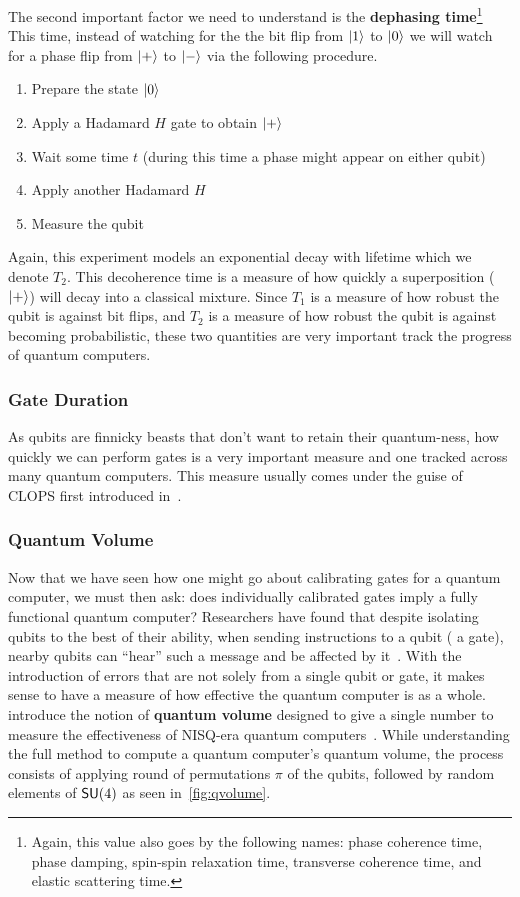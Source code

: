 The second important factor we need to understand is the \textbf{dephasing time}\footnote{Again, this value also goes by the following names: phase coherence time, phase damping, spin-spin relaxation time, transverse coherence time, and elastic scattering time.}
This time, instead of watching for the the bit flip from $\ket{1}$ to $\ket{0}$ we will watch for a phase flip from $\ket{+}$ to $\ket{-}$ via the following procedure.
\begin{enumerate}
    \item Prepare the state $\ket{0}$
    \item Apply a Hadamard $H$ gate to obtain $\ket{+}$
    \item Wait some time $t$ (during this time a phase might appear on either qubit)
    \item Apply another Hadamard $H$
    \item Measure the qubit
\end{enumerate}
Again, this experiment models an exponential decay with lifetime which we denote $T_2$.
This decoherence time is a measure of how quickly a superposition ($\ket{+}$) will decay into a classical mixture.
Since $T_1$ is a measure of how robust the qubit is against bit flips, and $T_2$ is a measure of how robust the qubit is against becoming probabilistic, these two quantities are very important track the progress of quantum computers.

\subsubsection{Gate Duration}

As qubits are finnicky beasts that don't want to retain their quantum-ness, how quickly we can perform gates is a very important measure and one tracked across many quantum computers.
This measure usually comes under the guise of \ac{CLOPS} first introduced in~\cite{clops}.

\subsubsection{Quantum Volume}

Now that we have seen how one might go about calibrating gates for a quantum computer, we must then ask: does individually calibrated gates imply a fully functional quantum computer?
Researchers have found that despite isolating qubits to the best of their ability, when sending instructions to a qubit (\eg{} a gate), nearby qubits can ``hear'' such a message and be affected by it~\cite{crosstalk,crosstalk2}.
With the introduction of errors that are not solely from a single qubit or gate, it makes sense to have a measure of how effective the quantum computer is as a whole.
\citeauthor{qvolume} introduce the notion of \textbf{quantum volume} designed to give a single number to measure the effectiveness of \ac{NISQ}-era quantum computers~\cite{qvolume}.
While understanding the full method to compute a quantum computer's quantum volume, the process consists of applying round of permutations $\pi$ of the qubits, followed by random elements of $\mathsf{SU} (4)$ as seen in~\cref{fig:qvolume}.

